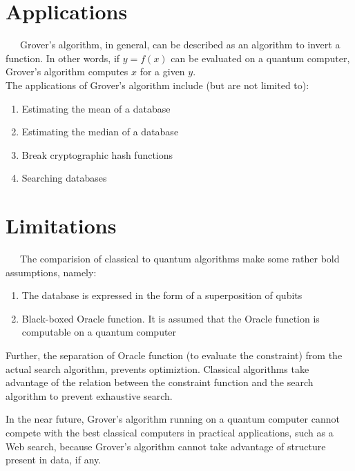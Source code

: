 \documentclass[a4paper]{article}
\begin{document}
\pagebreak


\section{ Applications }
~~~Grover's algorithm, in general, can be described as an algorithm to invert a function.
In other words, if $y = f(x)$ can be evaluated on a quantum computer, Grover's algorithm
computes $x$ for a given $y$.
\\
The applications of Grover's algorithm include (but are not limited to):
\begin{enumerate}
        \item Estimating the mean of a database
        \item Estimating the median of a database 
        \item Break cryptographic hash functions 
        \item Searching databases
\end{enumerate}

\section { Limitations }
~~~The comparision of classical to quantum algorithms make some rather bold assumptions,
namely:

\begin{enumerate}
        \item The database is expressed in the form of a superposition of qubits
        \item Black-boxed Oracle function. It is assumed that the Oracle function
            is computable on a quantum computer
\end{enumerate}
\par
Further, the separation of Oracle function (to evaluate the constraint) from the actual
search algorithm, prevents optimiztion. Classical algorithms take advantage of the relation
between the constraint function and the search algorithm to prevent exhaustive search.
\par

In the near future, Grover's algorithm running on a quantum computer cannot compete
with the best classical computers in practical applications, such as a Web search, because
Grover's algorithm cannot take advantage of structure present in data, if any.

\pagebreak


\end{document}
